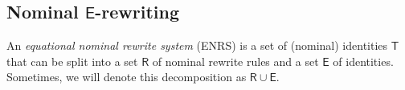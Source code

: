 \documentclass[submission,copyright,creativecommons]{eptcs}
\newcommand{\alert}[1]{\textcolor{red}{#1}}
\newcommand{\theory}[1]{\ensuremath{\mathsf{#1}}}
\theoremstyle{plain}
\theoremstyle{definition}
\theoremstyle{remark}
\begin{document}
\subsection{Nominal \theory{E}-rewriting}
An {\em equational nominal rewrite system} (ENRS)   is a set of (nominal) identities $\theory{T}$ that can be split into a set $\theory{R}$ of nominal rewrite rules and a set $\theory{E}$ of identities. Sometimes, we will denote this decomposition as 
$\theory{R}{\cup}\theory{E}$.
%
\end{document}
